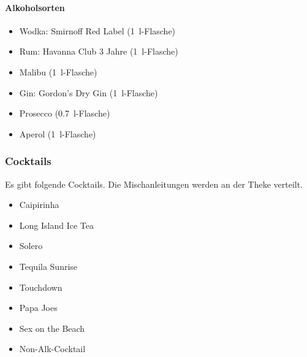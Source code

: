 \paragraph{Alkoholsorten}
\begin{itemize}
    \item Wodka: Smirnoff Red Label (\SI{1}{\litre}-Flasche)
    \item Rum: Havanna Club 3 Jahre (\SI{1}{\litre}-Flasche)
    \item Malibu (\SI{1}{\litre}-Flasche)
    \item Gin: Gordon's Dry Gin (\SI{1}{\litre}-Flasche)
    \item Prosecco (\SI{0.7}{\litre}-Flasche)
    \item Aperol (\SI{1}{\litre}-Flasche)
\end{itemize}

\subsubsection{Cocktails}
Es gibt folgende Cocktails. Die Mischanleitungen werden an der Theke verteilt.
\begin{itemize}
    \item Caipirinha
    \item Long Island Ice Tea
    \item Solero
    \item Tequila Sunrise
    \item Touchdown
    \item Papa Joes
    \item Sex on the Beach
    \item Non-Alk-Cocktail
\end{itemize}
